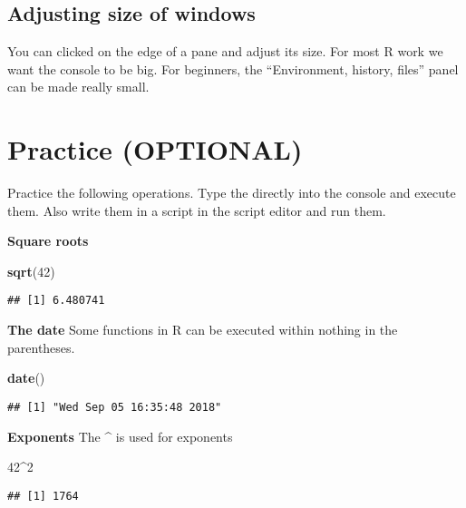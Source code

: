 \documentclass[]{book}
\newenvironment{Shaded}{\begin{snugshade}}{\end{snugshade}}
\newcommand{\KeywordTok}[1]{\textcolor[rgb]{0.13,0.29,0.53}{\textbf{#1}}}
\newcommand{\DecValTok}[1]{\textcolor[rgb]{0.00,0.00,0.81}{#1}}
\newcommand{\OperatorTok}[1]{\textcolor[rgb]{0.81,0.36,0.00}{\textbf{#1}}}
\newcommand{\NormalTok}[1]{#1}
\theoremstyle{definition}
\theoremstyle{definition}
\theoremstyle{definition}
\theoremstyle{remark}
\begin{document}
\subsection{Adjusting size of windows}\label{adjusting-size-of-windows}

You can clicked on the edge of a pane and adjust its size. For most R
work we want the console to be big. For beginners, the ``Environment,
history, files'' panel can be made really small.

\section{Practice (OPTIONAL)}\label{practice-optional}

Practice the following operations. Type the directly into the console
and execute them. Also write them in a script in the script editor and
run them.

\textbf{Square roots}

\begin{Shaded}
\begin{Highlighting}[]
\KeywordTok{sqrt}\NormalTok{(}\DecValTok{42}\NormalTok{)}
\end{Highlighting}
\end{Shaded}

\begin{verbatim}
## [1] 6.480741
\end{verbatim}

\textbf{The date} Some functions in R can be executed within nothing in
the parentheses.

\begin{Shaded}
\begin{Highlighting}[]
\KeywordTok{date}\NormalTok{()}
\end{Highlighting}
\end{Shaded}

\begin{verbatim}
## [1] "Wed Sep 05 16:35:48 2018"
\end{verbatim}

\textbf{Exponents} The \textbf{\^{}} is used for exponents

\begin{Shaded}
\begin{Highlighting}[]
\DecValTok{42}\OperatorTok{^}\DecValTok{2}
\end{Highlighting}
\end{Shaded}

\begin{verbatim}
## [1] 1764
\end{verbatim}
\end{document}
